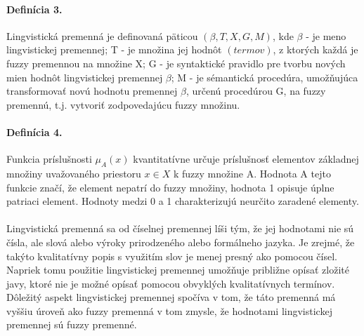 \paragraph*{Definícia 3.}
Lingvistická premenná je definovaná päticou 
$
\left(
\beta, T, X, G, M
 \right) 
$, kde 
$\beta$ - je meno lingvistickej premennej; 
T - je množina jej hodnôt $\left( termov \right) $, z ktorých každá je fuzzy premennou na množine X;
G - je syntaktické pravidlo pre tvorbu nových mien hodnôt lingvistickej premennej $\beta$;
M - je sémantická procedúra, umožňujúca transformovať novú hodnotu premennej $\beta$, určenú procedúrou G, na fuzzy premennú, t.j. vytvoriť zodpovedajúcu fuzzy množinu. \cite{levashenkoProj}


\paragraph*{Definícia 4.}
Funkcia príslušnosti $\mu_A\left( x\right)$ kvantitatívne určuje príslušnosť elementov základnej množiny uvažovaného priestoru $x \in X$ k fuzzy množine A. Hodnota A tejto funkcie značí, že element nepatrí do fuzzy množiny, hodnota 1 opisuje úplne patriaci element. Hodnoty medzi 0 a 1 charakterizujú neurčito zaradené elementy. \cite{levashenkoProj, Kaufman1985, Klir1995, Navara2011}

\paragraph*{}
Lingvistická premenná sa od číselnej premennej líši tým, že jej hodnotami nie sú čísla, ale slová alebo výroky prirodzeného alebo formálneho jazyka. Je zrejmé, že takýto 
kvalitatívny popis s využitím slov je menej presný ako pomocou čísel. Napriek tomu použitie lingvistickej premennej umožňuje približne opísať zložité javy, ktoré nie je možné opísať pomocou obvyklých kvalitatívnych termínov. Dôležitý aspekt lingvistickej premennej spočíva v tom, že táto premenná má vyššiu úroveň ako fuzzy premenná v tom zmysle, že hodnotami lingvistickej premennej sú fuzzy premenné.  \cite{levashenkoProj}


























